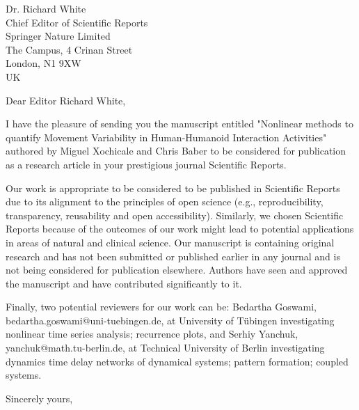 \documentclass[10pt]{letter}
\begin{document}
\begin{letter}{Dr. Richard White \\
Chief Editor of Scientific Reports \\
Springer Nature Limited \\
The Campus, 4 Crinan Street\\
London, N1 9XW \\
UK
}
\opening{Dear Editor Richard White,}

I have the pleasure of sending you the manuscript entitled 
"Nonlinear methods to quantify Movement Variability in Human-Humanoid Interaction Activities"
authored by Miguel Xochicale and Chris Baber to be considered for publication as a research article 
in your prestigious journal Scientific Reports.

Our work is appropriate to be considered to be published in Scientific Reports due to
its alignment to the principles of open science (e.g., reproducibility, transparency, reusability and open accessibility).
Similarly, we chosen Scientific Reports because of the outcomes of our work might lead to 
potential applications in areas of natural and clinical science.
Our manuscript is containing original research and has not been submitted or published earlier 
in any journal and is not being considered for publication elsewhere. 
Authors have seen and approved the manuscript and have contributed significantly to it.

Finally, two potential reviewers for our work can be:
Bedartha Goswami, bedartha.goswami@uni-tuebingen.de,
at University of Tübingen investigating nonlinear time series analysis; recurrence plots, and
Serhiy Yanchuk, yanchuk@math.tu-berlin.de, at Technical University of Berlin investigating 
dynamics time delay networks of dynamical systems; pattern formation; coupled systems.



\closing{Sincerely yours,}


\end{letter}
\end{document}
